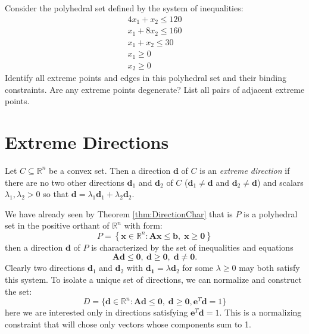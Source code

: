 \begin{exercise} Consider the polyhedral set defined by the system of inequalities:
\begin{gather*}
4x_1 + x_2 \leq 120\\
x_1 + 8x_2 \leq 160\\
x_1 + x_2 \leq 30\\
x_1 \geq 0\\
x_2 \geq 0
\end{gather*}
Identify all extreme points and edges in this polyhedral set and their binding constraints. Are any extreme points degenerate? List all pairs of adjacent extreme points.
\end{exercise}

\section{Extreme Directions}
\begin{definition} Let $C \subseteq\mathbb{R}^n$ be a convex set. Then a direction $\mathbf{d}$ of $C$ is an \textit{extreme direction} if there are no two other directions $\mathbf{d}_1$ and $\mathbf{d}_2$ of $C$ ($\mathbf{d}_1 \neq \mathbf{d}$ and $\mathbf{d}_2 \neq \mathbf{d}$) and scalars $\lambda_1,\lambda_2 > 0$ so that $\mathbf{d} = \lambda_1\mathbf{d}_1 + \lambda_2\mathbf{d}_2$. 
\end{definition}

We have already seen by Theorem \ref{thm:DirectionChar} that is $P$ is a polyhedral set in the positive orthant of $\mathbb{R}^n$ with form:
\begin{displaymath}
P = \left\{\mathbf{x} \in \mathbb{R}^n : \mathbf{A} \mathbf{x} \leq \mathbf{b},\;\mathbf{x} \geq \mathbf{0}\right\}
\end{displaymath}
then a direction $\mathbf{d}$ of $P$ is characterized by the set of inequalities and equations
\begin{displaymath}
\mathbf{A}\mathbf{d} \leq \mathbf{0},\:\mathbf{d} \geq \mathbf{0},\;\mathbf{d} \neq \mathbf{0}.
\end{displaymath}
Clearly two directions $\mathbf{d}_1$ and $\mathbf{d}_2$ with $\mathbf{d_1} = \lambda\mathbf{d}_2$ for some $\lambda \geq 0$ may both satisfy this system. To isolate a unique set of directions, we can normalize and construct the set:
\begin{equation}
D = \{\mathbf{d} \in \mathbb{R}^n : \mathbf{A}\mathbf{d} \leq \mathbf{0},\;\mathbf{d} \geq \mathbf{0},\mathbf{e}^T\mathbf{d} = 1\}
\end{equation}
here we are interested only in directions satisfying $\mathbf{e}^T\mathbf{d} = 1$. This is a normalizing constraint that will chose only vectors whose components sum to 1.

